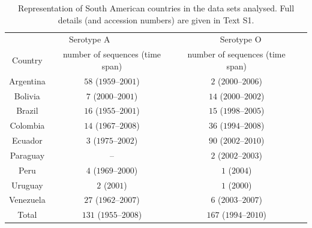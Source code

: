 \documentclass[a4paper,10pt]{article}
\begin{document}
\begin{table}[H]
 \caption{
 Representation of South American countries in the data sets analysed.
 Full details (and accession numbers) are given in Text S1.
 }
 \begin{center}
 \begin{tabular}{cccc}
 \toprule
   \multicolumn{2}{c}{Serotype A}& \multicolumn{2}{c}{Serotype O}\\
 Country & number of sequences (time span)& number of sequences (time span) & \\ 
  \midrule
Argentina & $58$ ($1959$--$2001$)& $2$ ($2000$--$2006$)  \\
Bolivia   & $7$ ($2000$--$2001$)& $14$ ($2000$--$2002$)  \\
Brazil    & $16$ ($1955$--$2001$)& $15$ ($1998$--$2005$)  \\
Colombia  & $14$ ($1967$--$2008$)& $36$ ($1994$--$2008$)  \\
Ecuador   & $3$ ($1975$--$2002$)& $90$ ($2002$--$2010$)  \\
Paraguay                    & --& $2$ ($2002$--$2003$)  \\
Peru      & $4$ ($1969$--$2000$)& $1$ ($2004$)  \\
Uruguay   & $2$ ($2001$)& $1$ ($2000$)  \\
Venezuela & $27$ ($1962$--$2007$)& $6$ ($2003$--$2007$)  \\
Total     & $131$ ($1955$--$2008$) & $167$ ($1994$--$2010$)\\
  \bottomrule
 \end{tabular}
 \end{center}
\label{stab:reps}
\end{table}
\end{document}
